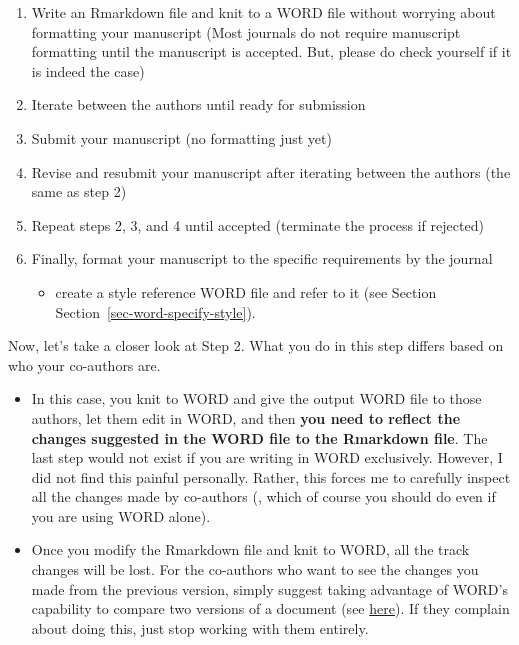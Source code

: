 \documentclass[
  letterpaper,
  DIV=11,
  numbers=noendperiod]{scrreprt}
\providecommand{\tightlist}{%
  \setlength{\itemsep}{0pt}\setlength{\parskip}{0pt}}\usepackage{longtable,booktabs,array}
\begin{document}
\begin{enumerate}
\def\labelenumi{\arabic{enumi}.}
\tightlist
\item
  Write an Rmarkdown file and knit to a WORD file without worrying about
  formatting your manuscript (Most journals do not require manuscript
  formatting until the manuscript is accepted. But, please do check
  yourself if it is indeed the case)
\item
  Iterate between the authors until ready for submission
\item
  Submit your manuscript (no formatting just yet)
\item
  Revise and resubmit your manuscript after iterating between the
  authors (the same as step 2)
\item
  Repeat steps 2, 3, and 4 until accepted (terminate the process if
  rejected)
\item
  Finally, format your manuscript to the specific requirements by the
  journal

  \begin{itemize}
  \tightlist
  \item
    create a style reference WORD file and refer to it (see Section
    Section~\ref{sec-word-specify-style}).
  \end{itemize}
\end{enumerate}

Now, let's take a closer look at Step 2. What you do in this step
differs based on who your co-authors are.

\begin{tcolorbox}[enhanced jigsaw, colframe=quarto-callout-note-color-frame, toptitle=1mm, colbacktitle=quarto-callout-note-color!10!white, toprule=.15mm, colback=white, arc=.35mm, bottomtitle=1mm, opacitybacktitle=0.6, breakable, left=2mm, coltitle=black, leftrule=.75mm, title={Case 1: one of your co-authors demands a WORD file for editing for
him/herself}, rightrule=.15mm, titlerule=0mm, opacityback=0, bottomrule=.15mm]

\begin{itemize}
\tightlist
\item
  In this case, you knit to WORD and give the output WORD file to those
  authors, let them edit in WORD, and then \textbf{you need to reflect
  the changes suggested in the WORD file to the Rmarkdown file}. The
  last step would not exist if you are writing in WORD exclusively.
  However, I did not find this painful personally. Rather, this forces
  me to carefully inspect all the changes made by co-authors (, which of
  course you should do even if you are using WORD alone).
\item
  Once you modify the Rmarkdown file and knit to WORD, all the track
  changes will be lost. For the co-authors who want to see the changes
  you made from the previous version, simply suggest taking advantage of
  WORD's capability to compare two versions of a document (see
  \href{https://www.businessinsider.com/guides/tech/how-to-compare-two-word-documents}{here}).
  If they complain about doing this, just stop working with them
  entirely.
\end{itemize}

\end{tcolorbox}
\end{document}
